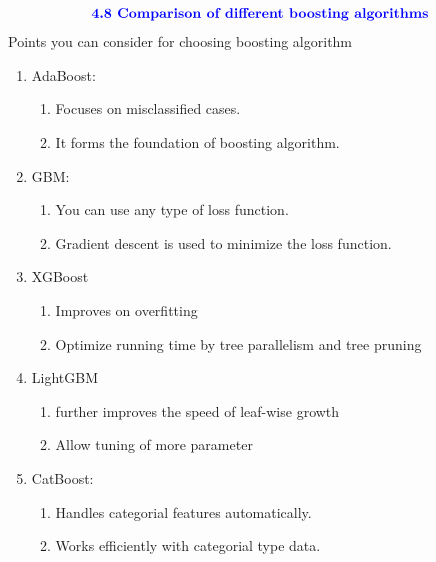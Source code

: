 \documentclass{homework}
\begin{document}
\begin{align*}
    \textcolor{blue}{ \text{{\textbf{4.8 Comparison of different boosting algorithms}}}}
 \end{align*}
 Points you can consider for choosing boosting algorithm
\begin{enumerate}
    \item AdaBoost:
        \begin{enumerate}
            \item Focuses on misclassified cases.
            \item It forms the foundation of boosting algorithm.
        \end{enumerate}
    \item GBM:
        \begin{enumerate}
            \item You can use any type of loss function.
            \item Gradient descent is used to minimize the loss function.
        \end{enumerate}
    \item XGBoost
        \begin{enumerate}
            \item Improves on overfitting 
            \item Optimize running time by tree parallelism and tree pruning
        \end{enumerate}
    \item LightGBM
        \begin{enumerate}
            \item further improves the speed of leaf-wise growth
            \item Allow tuning of more parameter
        \end{enumerate}
    \item CatBoost:
        \begin{enumerate}
            \item Handles categorial features automatically.
            \item Works efficiently with categorial type data.
        \end{enumerate}
\end{enumerate}
\end{document}
